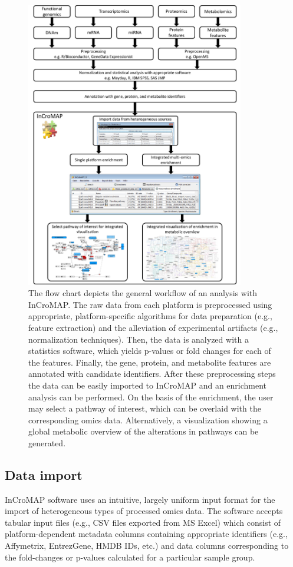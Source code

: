 \documentclass[final,5p,times,twocolumn]{elsarticle}
\newcommand\red[1]{{\color{red}#1}}
\begin{document}
\begin{figure}
\center
\includegraphics[width=0.85\textwidth]{InCroMAP_workflow.pdf}
\caption{The flow chart depicts the general workflow of an analysis with InCroMAP. The raw data from each platform is preprocessed using appropriate, platform-specific algorithms for data preparation (e.g., feature extraction) and the alleviation of experimental artifacts (e.g., normalization techniques). Then, the data is analyzed with a statistics software, which yields p-values or fold changes for each of the features. Finally, the gene, protein, and metabolite features are annotated with candidate identifiers. After these preprocessing steps the data can be easily imported to InCroMAP and an enrichment analysis can be performed. On the basis of the enrichment, the user may select a pathway of interest, which can be overlaid with the corresponding omics data. Alternatively, a visualization showing a global metabolic overview of the alterations in pathways can be generated.}
\label{fig:incromap-workflow}
\end{figure}

\subsection{Data import}
\red{InCroMAP software uses an intuitive, largely uniform input format for the import of heterogeneous types of processed omics data. The software accepts tabular input files (e.g., CSV files exported from MS Excel) which consist of platform-dependent metadata columns containing appropriate identifiers (e.g., Affymetrix, EntrezGene, HMDB IDs, etc.) and data columns corresponding to the fold-changes or p-values calculated for a particular sample group.}
\end{document}
